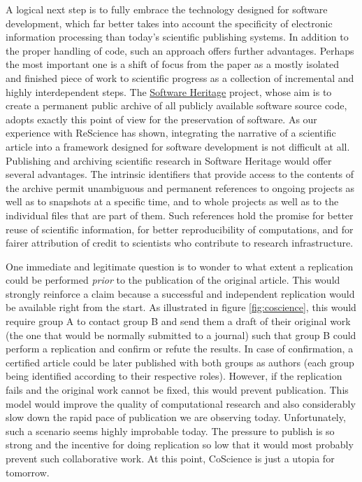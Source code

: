 \documentclass[a4paper,10pt, twocolumn]{article}
\begin{document}
A logical next step is to fully embrace the technology designed for
software development, which far better takes into account the
specificity of electronic information processing than today's
scientific publishing systems. In addition to the proper handling of
code, such an approach offers further advantages. Perhaps the most
important one is a shift of focus from the paper as a mostly isolated
and finished piece of work to scientific progress as a collection of
incremental and highly interdependent steps. The
\href{https://www.softwareheritage.org/}{Software Heritage} project,
whose aim is to create a permanent public archive of all publicly
available software source code, adopts exactly this point of view for
the preservation of software. As our experience with ReScience has
shown, integrating the narrative of a scientific article into a
framework designed for software development is not difficult at all.
Publishing and archiving scientific research in Software Heritage
would offer several advantages. The intrinsic identifiers that provide
access to the contents of the archive permit unambiguous and permanent
references to ongoing projects as well as to snapshots at a specific
time, and to whole projects as well as to the individual files that
are part of them. Such references hold the promise for better reuse of
scientific information, for better reproducibility of
computations, and for fairer attribution of credit to scientists
who contribute to research infrastructure.


One immediate and legitimate question is to wonder to what extent a
replication could be performed \textit{prior} to the publication of
the original article. This would strongly reinforce a claim because a
successful and independent replication would be available right from
the start. As illustrated in figure \ref{fig:coscience}, this would
require group A to contact group B and send them a draft of
their original work (the one that would be normally submitted to a
journal) such that group B could perform a replication and confirm or
refute the results. In case of confirmation, a certified article could
be later published with both groups as authors (each group being
identified according to their respective roles). However, if the
replication fails and the original work cannot be fixed, this would
prevent publication. This model would improve the quality of
computational research and also considerably slow down the rapid pace
of publication we are observing today. Unfortunately, such a scenario
seems highly improbable today. The pressure to publish is so strong
and the incentive for doing replication so low that it would most
probably prevent such collaborative work. At this point, CoScience is
just a utopia for tomorrow.




\renewcommand*{\bibfont}{\footnotesize}
\printbibliography[title=References]
\end{document}
